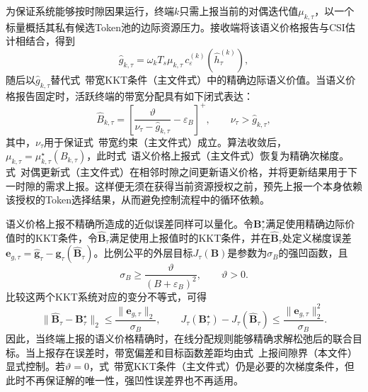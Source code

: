 \documentclass[journal]{IEEEtran}
\begin{document}
为保证系统能够按时隙因果运行，终端$k$只需上报当前的对偶迭代值$\mu_{k,\tau}$，以一个标量概括其私有候选Token池的边际资源压力。接收端将该语义价格报告与CSI估计相结合，得到
\begin{equation}
\widehat g_{k,\tau}
=\omega_kT_s\mu_{k,\tau}
\,c_{\varepsilon}^{(k)}(\widehat h_{\tau}^{(k)}),
\label{eq:online_semantic_report}
\end{equation}
随后以$\widehat g_{k,\tau}$替代式~带宽KKT条件（主文件式）中的精确边际语义价值。当语义价格报告固定时，活跃终端的带宽分配具有如下闭式表达：
\begin{equation}
\widehat B_{k,\tau}
=\left[\frac{\vartheta}{\nu_{\tau}-\widehat g_{k,\tau}}
-\varepsilon_B\right]^+,
\qquad \nu_{\tau}>\widehat g_{k,\tau},
\label{eq:reported_bandwidth_solution}
\end{equation}
其中，$\nu_{\tau}$用于保证式~带宽约束（主文件式）成立。算法收敛后，$\mu_{k,\tau}=\mu_{k,\tau}^{\star}(B_{k,\tau})$，此时式~语义价格上报式（主文件式）恢复为精确次梯度。式~对偶更新式（主文件式）在相邻时隙之间更新语义价格，并将更新结果用于下一时隙的需求上报。这样便无须在获得当前资源授权之前，预先上报一个本身依赖该授权的Token选择结果，从而避免控制流程中的循环依赖。

语义价格上报不精确所造成的近似误差同样可以量化。令$\bm B_{\tau}^{\star}$满足使用精确边际价值时的KKT条件，令$\widehat{\bm B}_{\tau}$满足使用上报值时的KKT条件，并在$\widehat{\bm B}_{\tau}$处定义梯度误差$\bm e_{g,\tau}=\widehat{\bm g}_{\tau}-\bm g_{\tau}(\widehat{\bm B}_{\tau})$。比例公平的外层目标$J_{\tau}(\bm B)$是参数为$\sigma_B$的强凹函数，且
\begin{equation}
\sigma_B\geq\frac{\vartheta}{(B+\varepsilon_B)^2},
\qquad \vartheta>0.
\label{eq:bandwidth_strong_concavity}
\end{equation}
比较这两个KKT系统对应的变分不等式，可得
\begin{equation}
\|\widehat{\bm B}_{\tau}-\bm B_{\tau}^{\star}\|_2
\leq\frac{\|\bm e_{g,\tau}\|_2}{\sigma_B},
\qquad
J_{\tau}(\bm B_{\tau}^{\star})-J_{\tau}(\widehat{\bm B}_{\tau})
\leq\frac{\|\bm e_{g,\tau}\|_2^2}{\sigma_B}.
\label{eq:bandwidth_report_gap}
\end{equation}
因此，当终端上报的语义价格精确时，在线分配规则能够精确求解松弛后的联合目标。当上报存在误差时，带宽偏差和目标函数差距均由式~上报间隙界（本文件）显式控制。若$\vartheta=0$，式~带宽KKT条件（主文件式）仍是必要的次梯度条件，但此时不再保证解的唯一性，强凹性误差界也不再适用。
\end{document}
